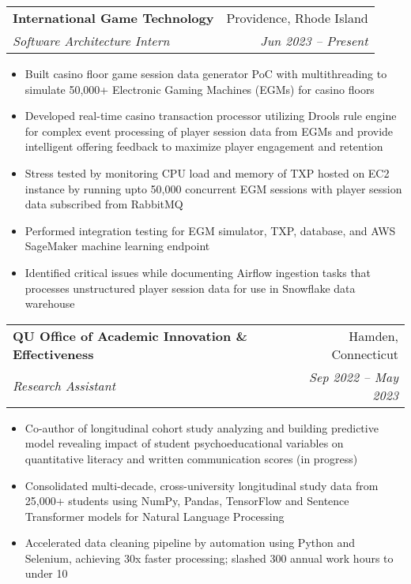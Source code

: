 \documentclass[letterpaper,11pt]{article}
\makeatletter
\newcommand{\resumeItem}[1]{
  \item\small{
    {#1 \vspace{-2pt}}
  }
}
\newcommand{\resumeSubheading}[4]{
  \vspace{-2pt}\item
    \begin{tabular*}{0.97\textwidth}[t]{l@{\extracolsep{\fill}}r}
      \textbf{#1} & #2 \\
      \textit{\small#3} & \textit{\small #4} \\
    \end{tabular*}\vspace{-7pt}
}
\newcommand{\resumeItemListStart}{\begin{itemize}}
\newcommand{\resumeItemListEnd}{\end{itemize}\vspace{-5pt}}
\makeatother
\begin{document}
    \resumeSubheading
      {International Game Technology}{Providence, Rhode Island}
      {Software Architecture Intern}{Jun 2023 -- Present}
        \resumeItemListStart
            \resumeItem{Built casino floor game session data generator PoC with multithreading to simulate 50,000+ Electronic Gaming Machines (EGMs) for casino floors}
            \resumeItem{Developed real-time casino transaction processor utilizing Drools rule engine for complex event processing of player session data from EGMs and provide intelligent offering feedback to maximize player engagement and retention}
            \resumeItem{Stress tested by monitoring CPU load and memory of TXP hosted on EC2 instance by running upto 50,000 concurrent EGM sessions with player session data subscribed from RabbitMQ}
            \resumeItem{Performed integration testing for EGM simulator, TXP, database, and AWS SageMaker machine learning endpoint}
            \resumeItem{Identified critical issues while documenting Airflow ingestion tasks that processes unstructured player session data for use in Snowflake data warehouse}
        \resumeItemListEnd

    \resumeSubheading
      {QU Office of Academic Innovation \& Effectiveness}{Hamden, Connecticut}
      {Research Assistant}{Sep 2022 -- May 2023}
        \resumeItemListStart
            \resumeItem{Co-author of longitudinal cohort study analyzing and building predictive model revealing impact of student psychoeducational variables on quantitative literacy and written communication scores (in progress)}
            \resumeItem{Consolidated multi-decade, cross-university longitudinal study data from 25,000+ students using NumPy, Pandas, TensorFlow and Sentence Transformer models for Natural Language Processing}
            \resumeItem{Accelerated data cleaning pipeline by automation using Python and Selenium, achieving 30x faster processing; slashed 300 annual work hours to under 10}
        \resumeItemListEnd

    
\end{document}
